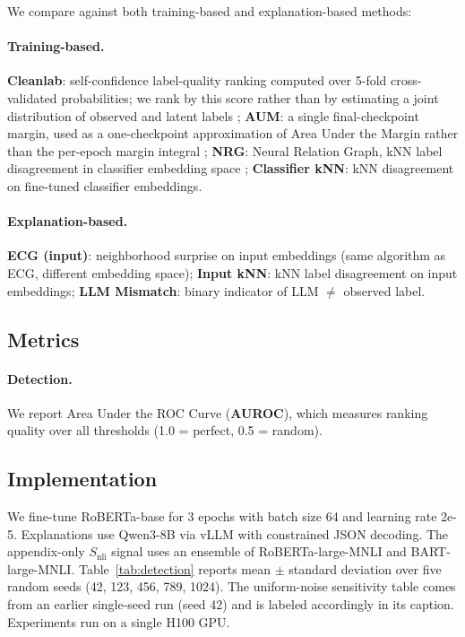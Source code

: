 \documentclass[letterpaper]{article}
\newcommand{\Snli}{S_{\text{nli}}}
\begin{document}
We compare against both training-based and explanation-based methods:

\paragraph{Training-based.}
\textbf{Cleanlab}: self-confidence label-quality ranking computed over 5-fold cross-validated probabilities; we rank by this score rather than by estimating a joint distribution of observed and latent labels \citep{northcutt2021confident};
\textbf{AUM}: a single final-checkpoint margin, used as a one-checkpoint approximation of Area Under the Margin rather than the per-epoch margin integral \citep{pleiss2020identifying};
\textbf{NRG}: Neural Relation Graph, kNN label disagreement in classifier embedding space \citep{kim2023neural};
\textbf{Classifier kNN}: kNN disagreement on fine-tuned classifier embeddings.

\paragraph{Explanation-based.}
\textbf{ECG (input)}: neighborhood surprise on input embeddings (same algorithm as ECG, different embedding space);
\textbf{Input kNN}: kNN label disagreement on input embeddings;
\textbf{LLM Mismatch}: binary indicator of LLM $\neq$ observed label.

\subsection{Metrics}

\paragraph{Detection.} We report Area Under the ROC Curve (\textbf{AUROC}), which measures ranking quality over all thresholds (1.0 = perfect, 0.5 = random).

\subsection{Implementation}

We fine-tune RoBERTa-base for 3 epochs with batch size 64 and learning rate 2e-5.
Explanations use Qwen3-8B \citep{qwen3} via vLLM \citep{vllm} with constrained JSON decoding.
The appendix-only $\Snli$ signal uses an ensemble of RoBERTa-large-MNLI and BART-large-MNLI.
Table~\ref{tab:detection} reports mean $\pm$ standard deviation over five random seeds (42, 123, 456, 789, 1024).
The uniform-noise sensitivity table comes from an earlier single-seed run (seed 42) and is labeled accordingly in its caption.
Experiments run on a single H100 GPU.
\end{document}
